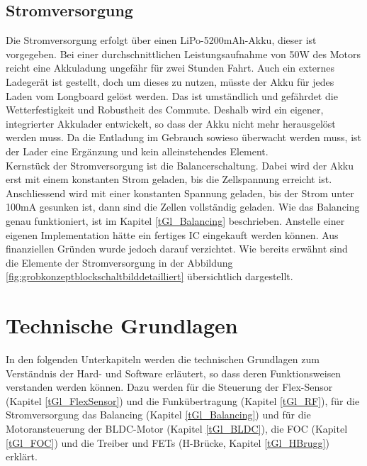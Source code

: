 \subsection*{Stromversorgung}
Die Stromversorgung erfolgt über einen LiPo-5200mAh-Akku, dieser ist vorgegeben. Bei einer durchschnittlichen Leistungsaufnahme von 50W des Motors reicht eine Akkuladung ungefähr für zwei Stunden Fahrt. Auch ein externes Ladegerät ist gestellt, doch um dieses zu nutzen, müsste der Akku für jedes Laden vom Longboard gelöst werden. Das ist umständlich und gefährdet die Wetterfestigkeit und Robustheit des Commute. Deshalb wird ein eigener, integrierter Akkulader entwickelt, so dass der Akku nicht mehr herausgelöst werden muss. Da die Entladung im Gebrauch sowieso überwacht werden muss, ist der Lader eine Ergänzung und kein alleinstehendes Element. \\ Kernstück der Stromversorgung ist die Balancerschaltung. Dabei wird der Akku erst mit einem konstanten Strom geladen, bis die Zellspannung erreicht ist. Anschliessend wird mit einer konstanten Spannung geladen, bis der Strom unter 100mA gesunken ist, dann sind die Zellen vollständig geladen. Wie das Balancing genau funktioniert, ist im Kapitel \ref{tGl_Balancing} beschrieben. Anstelle einer eigenen Implementation hätte ein fertiges IC eingekauft werden können. Aus finanziellen Gründen wurde jedoch darauf verzichtet. Wie bereits erwähnt sind die Elemente der Stromversorgung in der Abbildung \ref{fig:grobkonzeptblockschaltbilddetailliert} übersichtlich dargestellt.




\section{Technische Grundlagen}
In den folgenden Unterkapiteln werden die technischen Grundlagen zum Verständnis der Hard- und Software erläutert, so dass deren Funktionsweisen verstanden werden können.  Dazu werden für die Steuerung der Flex-Sensor (Kapitel \ref{tGl_FlexSensor}) und die Funkübertragung (Kapitel \ref{tGl_RF}), für die Stromversorgung das Balancing (Kapitel \ref{tGl_Balancing}) und für die Motoransteuerung der BLDC-Motor (Kapitel \ref{tGl_BLDC}), die FOC (Kapitel \ref{tGl_FOC}) und die Treiber und FETs (H-Brücke, Kapitel \ref{tGl_HBrugg}) erklärt.

